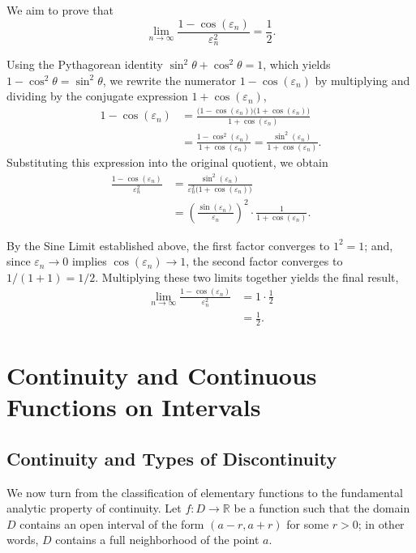 \begin{remark}

We aim to prove that
\[
\lim_{n \to \infty} \frac{1-\cos(\varepsilon_n)}{\varepsilon_n^2} = \frac{1}{2}.
\]

Using the Pythagorean identity $\sin^2\theta + \cos^2\theta = 1$, which yields $1-\cos^2\theta = \sin^2\theta$, we rewrite the numerator $1-\cos(\varepsilon_n)$ by multiplying and dividing by the conjugate expression $1+\cos(\varepsilon_n)$,
\[
\begin{aligned}
1 - \cos(\varepsilon_n)
&= \frac{\big(1-\cos(\varepsilon_n)\big)\big(1+\cos(\varepsilon_n)\big)}{1+\cos(\varepsilon_n)} \\
&= \frac{1-\cos^2(\varepsilon_n)}{1+\cos(\varepsilon_n)}
= \frac{\sin^2(\varepsilon_n)}{1+\cos(\varepsilon_n)}.
\end{aligned}
\]
Substituting this expression into the original quotient, we obtain
\[
\begin{aligned}
\frac{1-\cos(\varepsilon_n)}{\varepsilon_n^2} &= \frac{\sin^2(\varepsilon_n)}{\varepsilon_n^2 \big(1+\cos(\varepsilon_n)\big)} \\
&= \left( \frac{\sin(\varepsilon_n)}{\varepsilon_n} \right)^2 \cdot \frac{1}{1+\cos(\varepsilon_n)}.
\end{aligned}
\]

By the Sine Limit established above, the first factor converges to $1^2 = 1$; and, since $\varepsilon_n \to 0$ implies $\cos(\varepsilon_n) \to 1$, the second factor converges to $1/(1+1) = 1/2$. Multiplying these two limits together yields the final result,
\[
\begin{aligned}
\lim_{n \to \infty} \frac{1-\cos(\varepsilon_n)}{\varepsilon_n^2} &= 1 \cdot \frac{1}{2} \\
&= \frac{1}{2}.
\end{aligned}
\]

\end{remark}

\section{Continuity and Continuous Functions on Intervals}

\subsection{Continuity and Types of Discontinuity}

We now turn from the classification of elementary functions to the fundamental analytic property of continuity. Let $f : D \to \mathbb{R}$ be a function such that the domain $D$ contains an open interval of the form $(a-r, a+r)$ for some $r > 0$; in other words, $D$ contains a full neighborhood of the point $a$.

